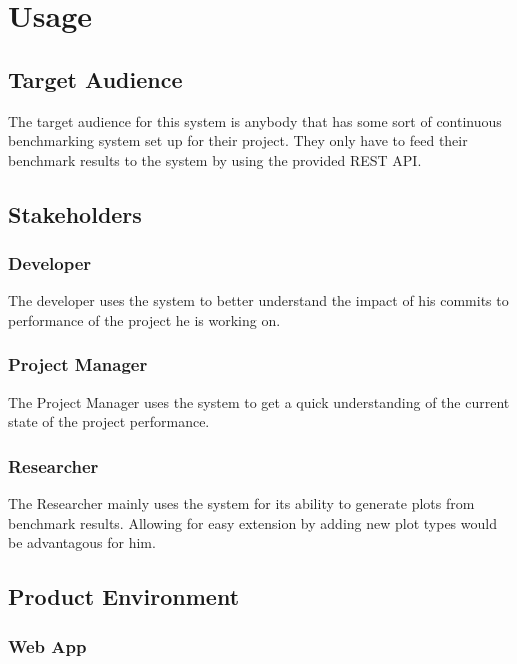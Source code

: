 \section{Usage}

\subsection{Target Audience}

The target audience for this system is anybody that has some sort of continuous benchmarking system set up for their project. They only have to feed their benchmark results to the system by using the provided \gls{REST API}.

\subsection{Stakeholders}

\subsubsection*{Developer}

The developer uses the system to better understand the impact of his commits to performance of the project he is working on.

\subsubsection*{Project Manager}

The Project Manager uses the system to get a quick understanding of the current state of the project performance.

\subsubsection*{Researcher}

The Researcher mainly uses the system for its ability to generate \glspl{plot} from benchmark results. Allowing for easy extension by adding new \gls{plot} types would be advantagous for him.


\subsection{Product Environment}

\subsubsection{Web App}

